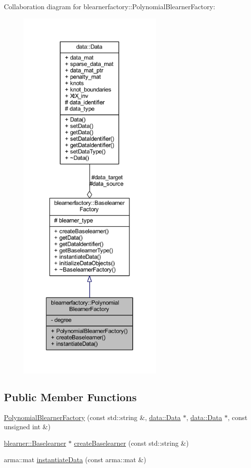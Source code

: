 Collaboration diagram for blearnerfactory\+:\+:Polynomial\+Blearner\+Factory\+:\nopagebreak
\begin{figure}[H]
\begin{center}
\leavevmode
\includegraphics[height=550pt]{classblearnerfactory_1_1_polynomial_blearner_factory__coll__graph}
\end{center}
\end{figure}
\subsection*{Public Member Functions}
\begin{DoxyCompactItemize}
\item 
\hyperlink{classblearnerfactory_1_1_polynomial_blearner_factory_a87a3247a9abe49009e1e951f25ed97cf}{Polynomial\+Blearner\+Factory} (const std\+::string \&, \hyperlink{classdata_1_1_data}{data\+::\+Data} $\ast$, \hyperlink{classdata_1_1_data}{data\+::\+Data} $\ast$, const unsigned int \&)
\item 
\hyperlink{classblearner_1_1_baselearner}{blearner\+::\+Baselearner} $\ast$ \hyperlink{classblearnerfactory_1_1_polynomial_blearner_factory_ac0c7f742da0a2de444e91a0cfb0a9384}{create\+Baselearner} (const std\+::string \&)
\item 
arma\+::mat \hyperlink{classblearnerfactory_1_1_polynomial_blearner_factory_aeea9c480671ae7cf7d3be470ce0feaef}{instantiate\+Data} (const arma\+::mat \&)
\end{DoxyCompactItemize}
